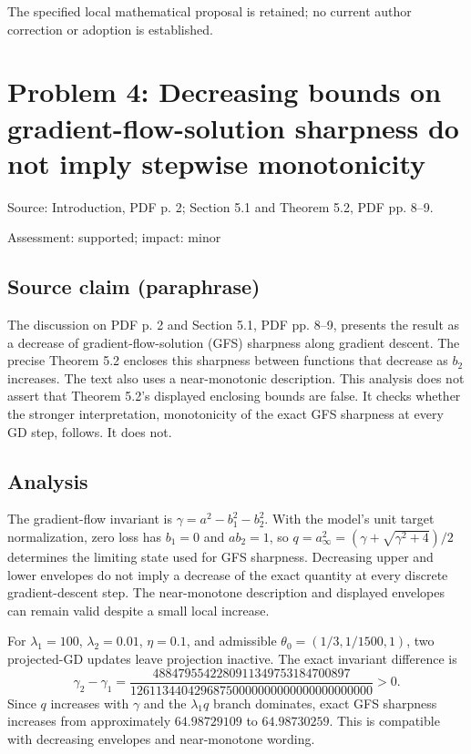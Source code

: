 \documentclass[11pt]{article}
\begin{document}
The specified local mathematical proposal is retained; no current author correction or adoption is established.

\section*{Problem 4: Decreasing bounds on gradient-flow-solution sharpness do not imply stepwise monotonicity}

Source: Introduction, PDF p. 2; Section 5.1 and Theorem 5.2, PDF pp. 8–9.

Assessment: supported; impact: minor

\subsection*{Source claim (paraphrase)}

The discussion on PDF p. 2 and Section 5.1, PDF pp. 8–9, presents the result as a decrease of gradient-flow-solution (GFS) sharpness along gradient descent. The precise Theorem 5.2 encloses this sharpness between functions that decrease as \(b_2\) increases. The text also uses a near-monotonic description. This analysis does not assert that Theorem 5.2’s displayed enclosing bounds are false. It checks whether the stronger interpretation, monotonicity of the exact GFS sharpness at every GD step, follows. It does not.

\subsection*{Analysis}

The gradient-flow invariant is \(\gamma=a^2-b_1^2-b_2^2\). With the model's unit target normalization, zero loss has \(b_1=0\) and \(ab_2=1\), so \(q=a_\infty^2=(\gamma+\sqrt{\gamma^2+4})/2\) determines the limiting state used for GFS sharpness. Decreasing upper and lower envelopes do not imply a decrease of the exact quantity at every discrete gradient-descent step. The near-monotone description and displayed envelopes can remain valid despite a small local increase.

For \(\lambda_1=100\), \(\lambda_2=0.01\), \(\eta=0.1\), and admissible \(\theta_0=(1/3,1/1500,1)\), two projected-GD updates leave projection inactive. The exact invariant difference is \[\gamma_2-\gamma_1=\frac{4884795542280911349753184700897}{12611344042968750000000000000000000000}>0.\] Since \(q\) increases with \(\gamma\) and the \(\lambda_1q\) branch dominates, exact GFS sharpness increases from approximately \(64.98729109\) to \(64.98730259\). This is compatible with decreasing envelopes and near-monotone wording.
\end{document}

